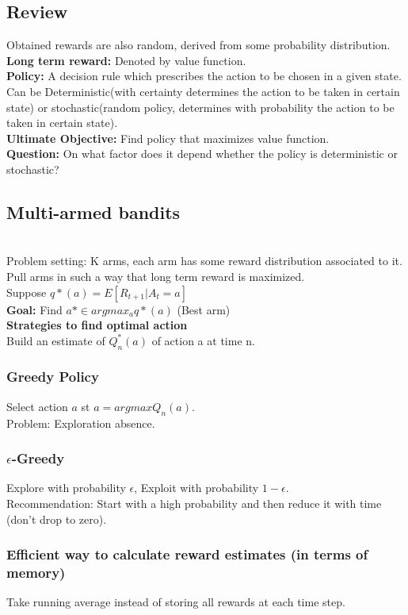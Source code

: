 \documentclass{book}
\begin{document}
\subsection{Review}
Obtained rewards are also random, derived from some probability distribution.\\
\textbf{Long term reward:} Denoted by value function.\\
\textbf{Policy:} A decision rule which prescribes the action to be chosen in a given state.\\
Can be Deterministic(with certainty determines the action to be taken in certain state) or stochastic(random policy, determines with probability the action to be taken in certain state).\\
\textbf{Ultimate Objective:} Find policy that maximizes value function.\\
\textbf{Question:} On what factor does it depend whether the policy is deterministic or stochastic?

\subsection{Multi-armed bandits}
\\
Problem setting: K arms, each arm has some reward distribution associated to it. Pull arms in such a way that long term reward is maximized.\\

\noindent Suppose $q*(a) = E[R_{t+1} | A_{t} = a]$\\
\textbf{Goal:} Find $a* \in argmax_{a} q*(a)$ (Best arm) \\

\textbf{Strategies to find optimal action}\\
Build an estimate of $Q_{n}^{*}(a)$ of action a at time n.\\

\subsubsection{Greedy Policy}
Select action $a$ st $a = argmax Q_{n}(a)$.\\
Problem: Exploration absence.\\

\subsubsection{$\epsilon$-Greedy}
Explore with probability $\epsilon$, Exploit with probability $1-\epsilon$.\\
Recommendation: Start with a high probability and then reduce it with time (don't drop to zero).\\

\subsubsection{Efficient way to calculate reward estimates (in terms of memory)}
Take running average instead of storing all rewards at each time step.
\end{document}
